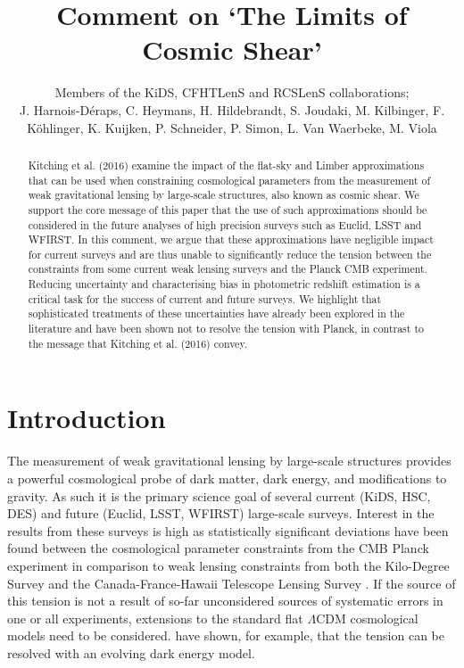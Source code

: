\documentclass[a4paper, preprint, fleqn, usenatbib]{aastex}
\begin{document}
\title{\huge{Comment on `The Limits of Cosmic Shear'}}

\author{Members of the KiDS, CFHTLenS and RCSLenS collaborations; \\
J. Harnois-D\'eraps, C. Heymans, H. Hildebrandt, S. Joudaki,  M. Kilbinger, F. K\"ohlinger, K. Kuijken, P. Schneider, P. Simon, L. Van Waerbeke, M. Viola}%


\begin{abstract}
Kitching et al. (2016) examine the impact of the flat-sky and Limber approximations that can be used when constraining cosmological parameters from the measurement of weak gravitational lensing by large-scale structures, also known as cosmic shear.  We support the core message of this paper that the use of such approximations should be considered in the future analyses of high precision surveys such as Euclid, LSST and WFIRST.  In this comment, we argue that these approximations have negligible impact for current surveys and are thus unable to significantly reduce the tension between the constraints from some current weak lensing surveys and the Planck CMB experiment.  Reducing uncertainty and characterising bias in photometric redshift estimation is a critical task for the success of current and future surveys.  We highlight that sophisticated treatments of these uncertainties have already been explored in the literature and have been shown not to resolve the tension with Planck, in contrast to the message that Kitching et al. (2016) convey.

\end{abstract}
\section{Introduction}

The measurement of weak gravitational lensing by large-scale structures provides a powerful cosmological probe of dark matter, dark energy, and modifications to gravity.  As such it is the primary science goal of several current (KiDS, HSC, DES) and future (Euclid, LSST, WFIRST) large-scale surveys. Interest in the results from these surveys is high as statistically significant deviations have been found between the cosmological parameter constraints from the CMB Planck experiment \citep{planck/cosmo:2015} in comparison to weak lensing constraints from both the Kilo-Degree Survey \citep[KiDS;][]{hildebrandt/etal:2016} and the Canada-France-Hawaii Telescope Lensing Survey \citep[CFHTLenS;][] {joudaki/etal:2016}.  If the source of this tension is not a result of so-far unconsidered sources of systematic errors in one or all experiments, extensions to the standard flat $\Lambda$CDM cosmological models need to be considered.  \citet{joudaki/etal:2017} have shown, for example, that the tension can be resolved with an evolving dark energy model.
\end{document}
